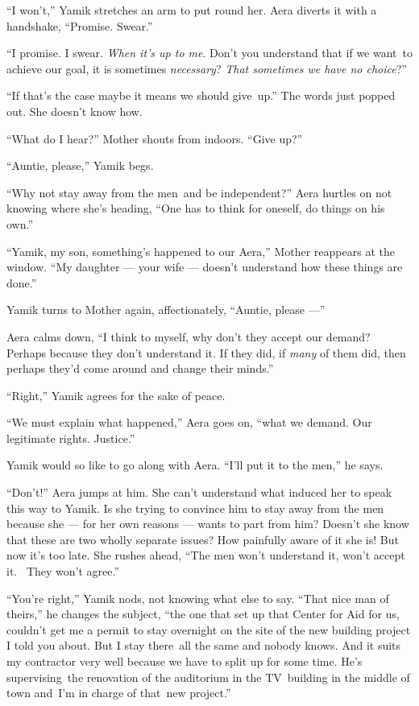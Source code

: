 \documentclass[twoside,11pt]{book}
\begin{document}
``I won't,'' Yamik stretches an arm to put round her. Aera diverts it with a handshake,
``Promise. Swear.''

``I promise. I swear. \textit{When it's up to me}. Don't you understand that if we want~to achieve our
goal, it is sometimes \textit{necessary}? \textit{That sometimes we have no choice}?''

``If that's the case maybe it means we should give~up.'' The words just popped out. She
doesn't know how.

{}``What do I hear?'' Mother shouts from indoors. ``Give up?''

{}``Auntie, please,'' Yamik begs.

{}``Why not stay away from the men~and be independent?'' Aera hurtles on not knowing where she's heading,
``One has to think for oneself, do things on his own.''

``Yamik, my son, something's happened to our Aera,'' Mother reappears at the window.
``My daughter --- your wife ---  doesn't understand how these things are done.''

Yamik turns to Mother again, affectionately, ``Auntie, please ---''

Aera calms down, ``I think to myself, why don't they accept our demand? Perhaps because they don't
understand it. If they did, if \textit{many} of them did, then perhaps they'd come around and change their
minds.''

``Right,'' Yamik agrees for the sake of peace.

``We must explain what happened,'' Aera goes on, ``what we demand. Our legitimate rights.
Justice.''

Yamik would so like to go along with Aera. ``I'll put it to the men,'' he says.

``Don't!'' Aera jumps at him. She can't understand what induced her to speak this way to
Yamik. Is she trying to convince him to stay away from the men because she --- for her own reasons --- wants to part from
him? Doesn't she know that these are two wholly separate issues? How painfully aware of it she is! But now it's too
late. She rushes ahead, ``The men won't understand it, won't accept it.~ They won't agree.''

``You're right,'' Yamik nods, not knowing what else to say. ``That nice man of
theirs,'' he changes the subject, ``the one that set up that Center for Aid for us, couldn't get me a permit to stay
overnight on the site of the new building project I told you about. But I stay there~all the same and nobody knows. And
it suits my contractor very well because we have to split up for some time. He's supervising~the renovation of the
auditorium in the TV~building in the middle of town and~I'm in charge of that~new project.''
\end{document}
